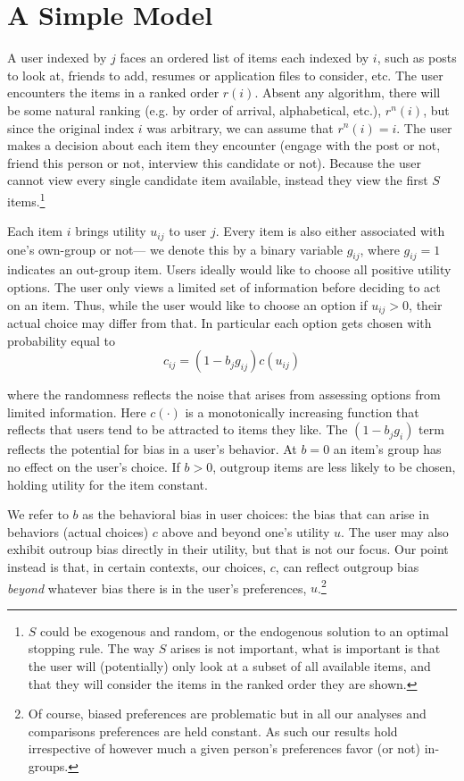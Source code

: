 \documentclass[12pt,letterpaper]{article}
\begin{document}
\section{A Simple Model}


A user indexed by $j$ faces an ordered list of items each indexed by $i$, such as posts to look at, friends to add, resumes or application files to consider, etc. The user encounters the items in a ranked order $r(i)$. Absent any algorithm, there will be some natural ranking (e.g. by order of arrival, alphabetical, etc.), $r^n(i)$, but since the original index $i$ was arbitrary, we can assume that $r^n(i) = i$. The user makes a decision about each item they encounter (engage with the post or not, friend this person or not, interview this candidate or not). Because the user cannot view every single candidate item available, instead they view the first $S$ items.\footnote{$S$ could be exogenous and random, or the endogenous solution to an optimal stopping rule. The way $S$ arises is not important, what is important is that the user will (potentially) only look at a subset of all available items, and that they will consider the items in the ranked order they are shown.}



Each item $i$ brings utility $u_{ij}$ to user $j$. Every item is also either associated with one's own-group or not--- we denote this by a binary variable $g_{ij}$, where $g_{ij}=1$ indicates an out-group item. Users ideally would like to choose all positive utility options. The user only views a limited set of information before deciding to act on an item. Thus, while the user would like to choose an option if $u_{ij} >0$, their actual choice may differ from that. In particular each option gets chosen with probability equal to 
$$c_{ij} = (1-b_jg_{ij})c(u_{ij})$$


where the randomness reflects the noise that arises from assessing options from limited information. Here $c(\cdot)$ is a monotonically increasing function that reflects that users tend to be attracted to items they like. The $(1-b_jg_{i})$ term reflects the potential for bias in a user's behavior. At $b=0$ an item's group has no effect on the user's choice. If $b >0$, outgroup items are less likely to be chosen, holding utility for the item constant. 

We refer to $b$ as the behavioral bias in user choices: the bias that can arise in behaviors (actual choices) $c$ above and beyond one's utility $u$. The user may also exhibit outroup bias directly in their utility, but that is not our focus. Our point instead is that, in certain contexts, our choices, $c$, can reflect outgroup bias \emph{beyond} whatever bias there is in the user's preferences, $u$.\footnote{Of course, biased preferences are problematic but in all our analyses and comparisons preferences are held constant. As such our results hold irrespective of however much a given person's preferences favor (or not) in-groups.} 
\end{document}
